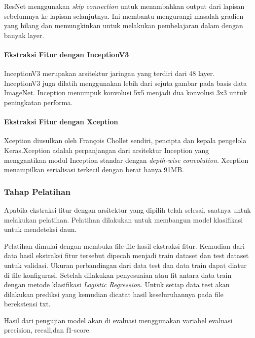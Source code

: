\par ResNet menggunakan \textit{skip connection} untuk menambahkan output dari lapisan sebelumnya ke lapisan selanjutnya. Ini membantu mengurangi masalah gradien yang hilang dan memungkinkan untuk melakukan pembelajaran dalam dengan banyak layer.

\paragraph{Ekstraksi Fitur dengan InceptionV3}
\mbox{}
\par InceptionV3 merupakan arsitektur jaringan yang terdiri dari 48 layer. InceptionV3 juga dilatih menggunakan lebih dari sejuta gambar pada basis data ImageNet. Inception menumpuk konvolusi 5x5 menjadi dua konvolusi 3x3 untuk peningkatan performa.

\paragraph{Ekstraksi Fitur dengan Xception}
\mbox{}
\par Xception diusulkan oleh François Chollet sendiri, pencipta dan kepala pengelola Keras.Xception adalah perpanjangan dari arsitektur Inception yang menggantikan modul Inception standar dengan \textit{depth-wise convolution}. Xception menampilkan serialisasi terkecil dengan berat hanya 91MB.

\subsubsection{Tahap Pelatihan}
\par Apabila ekstraksi fitur dengan arsitektur yang dipilih telah selesai, saatnya untuk melakukan pelatihan. Pelatihan dilakukan untuk membangun model klasifikasi untuk mendeteksi daun. 
\par Pelatihan dimulai dengan membuka file-file hasil ekstraksi fitur. Kemudian dari data hasil ekstraksi fitur tersebut dipecah menjadi train dataset dan test dataset untuk validasi. Ukuran perbandingan dari data test dan data train dapat diatur di file konfigurasi. Setelah dilakukan penyesuaian atau fit antara data train dengan metode klasifikasi \textit{Logistic Regression}. Untuk setiap data test akan dilakukan prediksi yang kemudian dicatat hasil keseluruhannya pada file berekstensi txt.
\par Hasil dari pengujian model akan di evaluasi menggunakan variabel evaluasi precision, recall,dan f1-score. 

